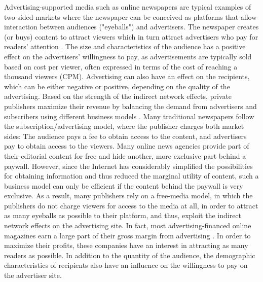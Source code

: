 \documentclass[12pt,a4paper,notitlepage]{article}
\begin{document}
Advertising-supported media such as online newspapers are typical examples of two-sided markets where the newspaper can be conceived as platforms that allow interaction between audiences ("eyeballs") and advertisers. The newspaper creates (or buys) content to attract viewers which in turn attract advertisers who pay for readers' attention \citep{evans_industrial_2005}. The size and characteristics of the audience has a positive effect on the advertisers' willingness to pay, as advertisements are typically sold based on cost per viewer, often expressed in terms of the cost of reaching a thousand viewers (CPM). Advertising can also have an effect on the recipients, which can be either negative or positive, depending on the quality of the advertising. Based on the strength of the indirect network effects, private publishers maximize their revenue by balancing the demand from advertisers and subscribers using different business models \citep{evans_economics_2008}. Many traditional newspapers follow the subscription/advertising model, where the publisher charges both market sides: The audience pays a fee to obtain access to the content, and advertisers pay to obtain access to the viewers. Many online news agencies provide part of their editorial content for free and hide another, more exclusive part behind a paywall. However, since the Internet has considerably simplified the possibilities for obtaining information and thus reduced the marginal utility of content, such a business model can only be efficient if the content behind the paywall is very exclusive. As a result, many publishers rely on a free-media model, in which the publishers do not charge viewers for access to the media at all, in order to attract as many eyeballs as possible to their platform, and thus, exploit the indirect network effects on the advertising site. In fact, most advertising-financed online magazines earn a large part of their gross margin from advertising \citep{evans_industrial_2005}. In order to maximize their profits, these companies have an interest in attracting as many readers as possible. In addition to the quantity of the audience, the demographic characteristics of recipients also have an influence on the willingness to pay on the advertiser site.
 
\end{document}
